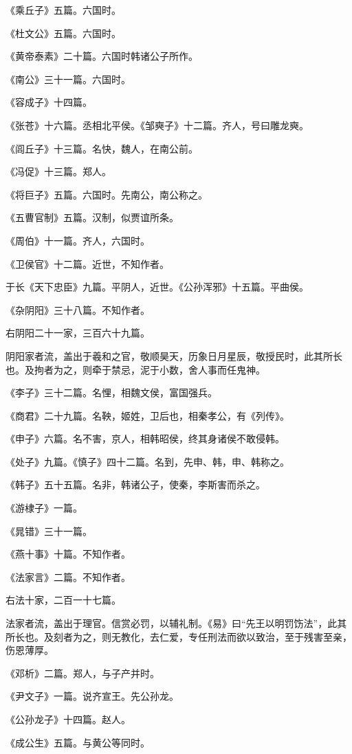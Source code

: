\documentclass[]{article}
\begin{document}
《乘丘子》五篇。六国时。

《杜文公》五篇。六国时。

《黄帝泰素》二十篇。六国时韩诸公子所作。

《南公》三十一篇。六国时。

《容成子》十四篇。

《张苍》十六篇。丞相北平侯。《邹奭子》十二篇。齐人，号曰雕龙奭。

《闾丘子》十三篇。名快，魏人，在南公前。

《冯促》十三篇。郑人。

《将巨子》五篇。六国时。先南公，南公称之。

《五曹官制》五篇。汉制，似贾谊所条。

《周伯》十一篇。齐人，六国时。

《卫侯官》十二篇。近世，不知作者。

于长《天下忠臣》九篇。平阴人，近世。《公孙浑邪》十五篇。平曲侯。

《杂阴阳》三十八篇。不知作者。

右阴阳二十一家，三百六十九篇。

阴阳家者流，盖出于羲和之官，敬顺昊天，历象日月星辰，敬授民时，此其所长也。及拘者为之，则牵于禁忌，泥于小数，舍人事而任鬼神。

《李子》三十二篇。名悝，相魏文侯，富国强兵。

《商君》二十九篇。名鞅，姬姓，卫后也，相秦孝公，有《列传》。

《申子》六篇。名不害，京人，相韩昭侯，终其身诸侯不敢侵韩。

《处子》九篇。《慎子》四十二篇。名到，先申、韩，申、韩称之。

《韩子》五十五篇。名非，韩诸公子，使秦，李斯害而杀之。

《游棣子》一篇。

《晁错》三十一篇。

《燕十事》十篇。不知作者。

《法家言》二篇。不知作者。

右法十家，二百一十七篇。

法家者流，盖出于理官。信赏必罚，以辅礼制。《易》曰``先王以明罚饬法''，此其所长也。及刻者为之，则无教化，去仁爱，专任刑法而欲以致治，至于残害至亲，伤恩薄厚。

《邓析》二篇。郑人，与子产并时。

《尹文子》一篇。说齐宣王。先公孙龙。

《公孙龙子》十四篇。赵人。

《成公生》五篇。与黄公等同时。
\end{document}
